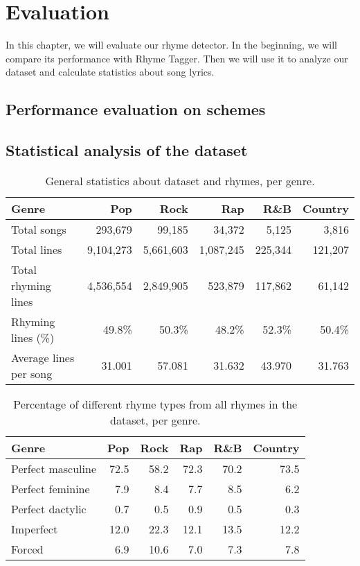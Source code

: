 \chapter{Evaluation}
In this chapter, we will evaluate our rhyme detector. In the beginning, we will compare its performance with Rhyme Tagger. Then we will use it to analyze our dataset and calculate statistics about song lyrics.

\section{Performance evaluation on schemes}

\section{Statistical analysis of the dataset}

\begin{table}[h!]
	\centering
	\begin{tabular}{l | r r r r r} 	
		Genre & 			Pop & 		Rock & 		Rap & 		R\&B & 		Country\\ 
		\midrule
		 Total songs& 293,679 & 99,185& 34,372& 5,125& 3,816 \\
		Total lines& 9,104,273 &5,661,603& 1,087,245& 225,344& 121,207 \\ 
		Total rhyming lines& 4,536,554& 2,849,905& 523,879& 117,862& 61,142 \\ 
		 Rhyming lines (\%) & 49.8\%& 50.3\%& 48.2\%& 52.3\%& 50.4\%  \\
		 Average lines per song & 31.001 & 57.081 & 31.632 & 43.970 & 31.763  \\

	\end{tabular}
	\caption{General statistics about dataset and rhymes, per genre.} 
	\label{rhyme_line_stats}
\end{table}

\begin{table}[h!]
	\centering
	\begin{tabular}{l | r r r r r} 	
		Genre & 			Pop & 		Rock & 		Rap & 		R\&B & 		Country\\ 
		\midrule
		Perfect masculine &	72.5& 	58.2& 	72.3& 	70.2& 	73.5 \\
		Perfect feminine &	7.9&		8.4& 		7.7& 		8.5& 		6.2 \\
		Perfect dactylic & 	0.7 &		0.5 & 	0.9 &		0.5& 		0.3 \\  
		Imperfect & 		12.0& 	22.3 & 	12.1 & 	13.5 & 	12.2 \\
		Forced &  			6.9 & 	10.6 & 	7.0 & 	7.3 &		7.8 \\
	\end{tabular}
	\caption{Percentage of different rhyme types from all rhymes in the dataset, per genre.} 
	\label{rhyme_types_perc}
\end{table}

